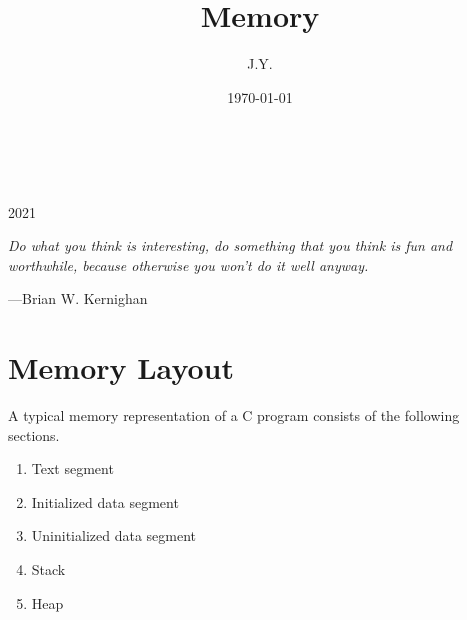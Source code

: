 \documentclass[a5paper,pagesize,10pt,bibtotoc,pointlessnumbers, normalheadings,DIV=9,twoside=false]{scrbook}
\title{Memory}
\author{J.Y.}
\date{\today}
\begin{document}
\begin{titlepage}
		\\
			
		\vspace{10mm}
		\\
		\vspace{\fill}
		\centering \large{2021}
\end{titlepage}


\newpage{}
\thispagestyle {empty}

\vspace*{2cm}

\begin{center}
	\Large{\parbox{10cm}{
		\begin{raggedright}
		{\Large 
			\textit{Do what you think is interesting, 
			do something that you think is fun and worthwhile, 
			because otherwise you won’t do it well anyway.}
		}
	
		\vspace{.5cm}\hfill{---Brian W. Kernighan}
		\end{raggedright} 
	}
}
\end{center}

\newpage



\section{Memory Layout}
A typical memory representation of a C program consists of the following sections.
\begin{enumerate}
	\item Text segment
	\item Initialized data segment
	\item Uninitialized data segment
	\item Stack
	\item Heap
\end{enumerate}
\end{document}
